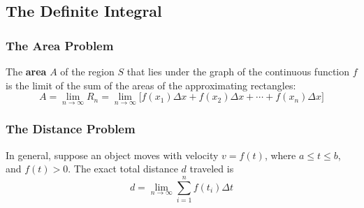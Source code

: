 \subsection{The Definite Integral}

\subsubsection*{The Area Problem}
\begin{definition}
    The \textbf{area} \(A\) of the region \(S\) that lies under the graph of
    the continuous function \(f\) is the limit of the sum of the areas of the
    approximating rectangles:
    \[A=\lim_{n\to\infty}R_n
    =\lim_{n\to\infty}\big[f(x_1)\Delta x+f(x_2)\Delta x+\cdots
    +f(x_n)\Delta x\big]\]
\end{definition}

\subsubsection*{The Distance Problem}
In general, suppose an object moves with velocity \(v=f(t)\), where
\(a\leq t\leq b\), and \(f(t)>0\).
The exact total distance \(d\) traveled is
\[d=\lim_{n\to\infty}\sum_{i=1}^n f(t_i)\Delta t\]

